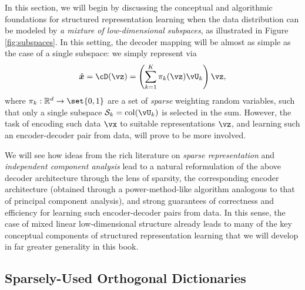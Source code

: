 \documentclass[../../book-main.tex]{subfiles}
\begin{document}
In this section, we will begin by discussing the conceptual and algorithmic
foundations for structured representation learning when the data distribution
can be modeled by {\em a mixture of low-dimensional subspaces}, as illustrated in Figure \ref{fig:subspaces}. In this setting, the decoder mapping will be almost as simple as the case of a single subspace: we simply represent via
\begin{equation}\label{eq:mixture-subspaces-decoder-first-cut}
    \hat{\x} = \cD(\vz) = \left( \sum_{k=1}^K \pi_k(\vz)\vU_k \right) \vz,
\end{equation}
where $\pi_k : \R^d \to \set{0,1}$ are a set of \textit{sparse} weighting random
variables, such that only a single subspace $\mathcal{S}_k
= \mathop{\mathrm{col}}(\vU_k) $ is selected in the sum.
However, the task of encoding such data $\vx$ to suitable representations $\vz$, and learning such an encoder-decoder pair from data, will prove to be more involved.

We will see how ideas from the rich literature on \textit{sparse representation}
and \textit{independent component analysis} lead to a natural reformulation of
the above decoder architecture through the lens of sparsity, the corresponding
encoder architecture (obtained through a power-method-like algorithm analogous
to that of principal component analysis), and strong guarantees of correctness
and efficiency for learning such encoder-decoder pairs from data. In this sense,
the case of mixed linear low-dimensional structure already leads to many of the
key conceptual components of structured representation learning that we will develop in
far greater generality in this book.


\subsection{Sparsely-Used Orthogonal Dictionaries}

\end{document}
